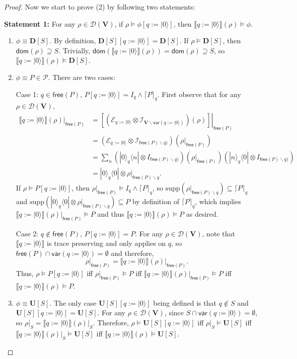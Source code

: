 \documentclass[conference,compsoc, 10pt]{IEEEtran}
\newcommand {\qI} {{q:=|0\rangle}}
\newcommand {\cD } {{\mathcal{D}}}
\newcommand {\cP } {{\mathcal{P}}}
\newcommand {\cE } {{\mathcal{E}}}
\newcommand {\cI } {{\mathcal{I}}}
\newcommand {\id } {{I}}
\newcommand {\bD} {{\mathbf{D}}}
\newcommand {\dom }[1] {{\mathsf{dom}\!\left(#1\right)}}
\newcommand {\free }[1] {{\mathsf{free}\left(#1\right)}}
\newcommand {\rt }[2] {{\left.{#1}\right|_{#2}}}
\newcommand {\vars } {\mathbf{V}}
\newcommand {\var } {\mathsf{var}}
\newcommand {\unia } {{\mathbf{U}}}
\newcommand {\sem}[1] {\llbracket#1\rrbracket}
\newcommand {\supp } {{\mathrm{supp}}}
\def\>{\ensuremath{\rangle}}
\def\<{\ensuremath{\langle}}
\begin{document}
\begin{appendices}
\begin{proof}
			Now we start to prove (2) by following two statements:
			
			{\bf Statement 1:} For any $\rho\in\cD(\vars)$, if $\rho\models\phi[\qI]$, then  $\sem{\qI}(\rho)\models\phi$.
			\begin{enumerate}
				\item $\phi\equiv \bD[S]$. By definition, $\bD[S][\qI] = \bD[S]$. If $\rho\models\bD[S]$, then $\dom {\rho}\supseteq S$. Trivially, $\dom {\sem{\qI}(\rho)} = \dom {\rho}\supseteq S$, so $\sem{\qI}(\rho)\models\bD[S]$.
				\item $\phi\equiv P\in\cP$. There are two cases: 
				
				Case 1: $q\in\free{P}$, $ P[\qI] = \id_q\wedge\lceil P\rceil_q$. First observe that for any $\rho\in\cD(\vars)$,
				\begin{align*}
				\rt{\sem{\qI}(\rho)}{\free{P}} &= \rt{\left[(\cE_{\qI}\otimes\cI_{\vars\backslash\var(\qI)})(\rho)\right]}{\free{P}} \\
				&= (\cE_{\qI}\otimes\cI_{\free{P}\backslash q)})(\rt{\rho}{\free{P}}) \\
				&= \sum_n(|0\>_q\<n|\otimes\id_{\free{P}\backslash q)})\left(\rt{\rho}{\free{P}}\right)(|n\>_q\<0|\otimes\id_{\free{P}\backslash q)}) \\
				&= |0\>_q\<0|\otimes \rt{\rho}{\free{P}\backslash q}.
				\end{align*}
				If $\rho\models P[\qI]$, then $\rt{\rho}{\free{P}}\models\id_q\wedge\lceil P\rceil_q$, so $\supp(\rt{\rho}{\free{P}\backslash q})\subseteq\lceil P\rceil_q$ and $\supp(|0\>_q\<0|\otimes\rt{\rho}{\free{P}\backslash q})\subseteq P$ by definition of $\lceil P\rceil_q$, which implies $\rt{\sem{\qI}(\rho)}{\free{P}}\models P$ and thus $\sem{\qI}(\rho)\models P$ as desired. 
				
				Case 2: $q\notin\free{P}$, $ P[\qI] = P$. For any $\rho\in\cD(\vars)$, note that $\sem{\qI}$ is trace preserving and only applies on $q$, so $\free{P}\cap\var(\qI) = \emptyset$ and therefore, 
				$$\rt{\rho}{\free{P}} = \rt{\sem{\qI}(\rho)}{\free{P}}.$$
				Thus, $\rho\models P[\qI]$ iff $\rt{\rho}{\free{P}}\models P$ iff $\rt{\sem{\qI}(\rho)}{\free{P}}\models P$ iff $\sem{\qI}(\rho)\models P$.
				
				\item $\phi\equiv \unia[S]$. The only case $\unia[S][\qI]$ being defined is that $q\notin S$ and $\unia[S][\qI] = \unia[S]$. For any $\rho\in\cD(\vars)$, since $S\cap\var(\qI) = \emptyset$, so $\rt{\rho}{S} = \rt{\sem{\qI}(\rho)}{S}$. Therefore, $\rho\models\unia[S][\qI]$ iff $\rt{\rho}{S}\models \unia[S]$ iff $\rt{\sem{\qI}(\rho)}{S}\models \unia[S]$ iff $\sem{\qI}(\rho)\models \unia[S]$.
				

\end{enumerate}
\end{proof}
\end{appendices}
\end{document}
